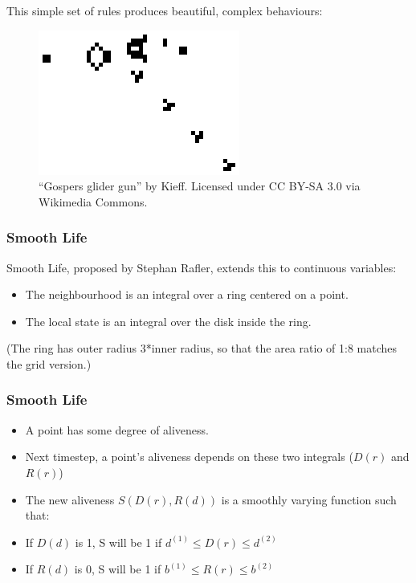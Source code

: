 This simple set of rules produces beautiful, complex behaviours:

\begin{figure}[htbp]
\centering
\includegraphics{07MPIExample/figures/gun.png}
\caption{``Gospers glider gun'' by Kieff. Licensed under CC BY-SA 3.0
via Wikimedia Commons.}
\end{figure}

\subsubsection{Smooth Life}\label{smooth-life-1}

Smooth Life, proposed by Stephan Rafler, extends this to continuous
variables:

\begin{itemize}
\itemsep1pt\parskip0pt
\item
  The neighbourhood is an integral over a ring centered on a point.
\item
  The local state is an integral over the disk inside the ring.
\end{itemize}

(The ring has outer radius 3*inner radius, so that the area ratio of 1:8
matches the grid version.)

\subsubsection{Smooth Life}\label{smooth-life-2}

\begin{itemize}
\itemsep1pt\parskip0pt
\item
  A point has some degree of aliveness.
\item
  Next timestep, a point's aliveness depends on these two integrals
  ($D(r)$ and $R(r)$)
\item
  The new aliveness $S(D(r),R(d))$ is a smoothly varying function such
  that:
\item
  If $D(d)$ is 1, S will be 1 if $d^{(1)} \leq D(r) \leq d^{(2)}$
\item
  If $R(d)$ is 0, S will be 1 if $b^{(1)}\leq R(r) \leq b^{(2)}$
\end{itemize}

